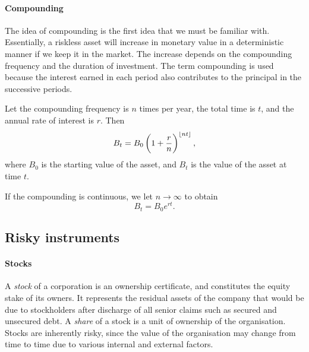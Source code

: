 \paragraph{Compounding}
The idea of compounding is the first idea that we must be familiar with. Essentially, a riskless asset will increase in monetary value in a deterministic manner if we keep it in the market. The increase depends on the compounding frequency and the duration of investment. The term compounding is used because the interest earned in each period also contributes to the principal in the successive periods.

Let the compounding frequency is $ n $ times per year, the total time is $ t $, and the annual rate of interest is $ r $. Then
\begin{equation}
\label{eq:intro-compounding-discrete}
B_t = B_0 \left(1 + \frac{r}{n} \right)^{\left\lfloor nt\right\rfloor},
\end{equation}
where $ B_0 $ is the starting value of the asset, and $ B_t $ is the value of the asset at time $ t $.

If the compounding is continuous, we let $ n \to \infty $ to obtain
\begin{equation}
\label{eq:intro-compounding-continous}
B_t = B_0 e^{rt}.
\end{equation}



\subsection{Risky instruments}
\label{subsec:intro-assets-risky}


\paragraph{Stocks}
A \emph{stock} of a corporation is an ownership certificate, and constitutes the equity stake of its owners. It represents the residual assets of the company that would be due to stockholders after discharge of all senior claims such as secured and unsecured debt. A \emph{share} of a stock is a unit of ownership of the organisation. Stocks are inherently risky, since the value of the organisation may change from time to time due to various internal and external factors.


